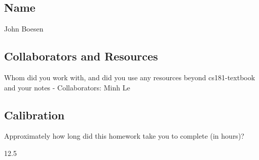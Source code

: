 \documentclass[submit]{harvardml}
\begin{document}
\subsection*{Name} John Boesen

\subsection*{Collaborators and Resources}
Whom did you work with, and did you use any resources beyond cs181-textbook and your notes
\newline
 - Collaborators: Minh Le

\subsection*{Calibration}
Approximately how long did this homework take you to complete (in hours)?

12.5
\end{document}
